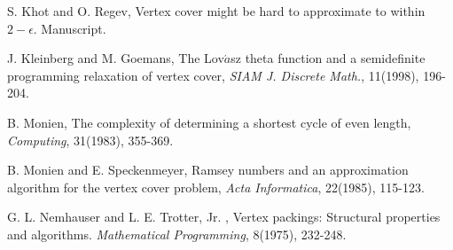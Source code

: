 \documentclass[12pt]{article}
\begin{document}
{\begin{thebibliography}{999}
 S. Khot and O. Regev, Vertex cover might be hard to
approximate to within $2-\epsilon$. Manuscript.

 J. Kleinberg and M. Goemans, The Lov$\acute{a}$sz theta function and
a semidefinite programming relaxation of vertex cover, {\it SIAM J.
Discrete Math.}, 11(1998), 196-204.

 B. Monien, The complexity of determining a shortest cycle of even length, {\it Computing}, 31(1983), 355-369.

 B. Monien and E. Speckenmeyer, Ramsey numbers and an approximation algorithm for
the vertex cover problem, {\it Acta Informatica}, 22(1985), 115-123.



 G. L. Nemhauser and L. E. Trotter, Jr. , Vertex packings: Structural properties
and algorithms. {\it Mathematical Programming}, 8(1975), 232-248.
\end{thebibliography}
}
\end{document}
